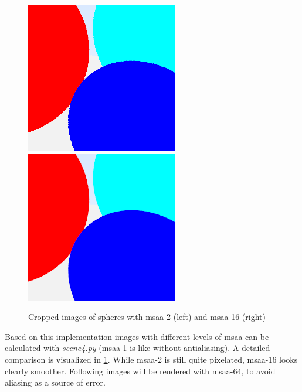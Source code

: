 \documentclass[]{article}
\begin{document}
	\begin{figure}[h]
		\centering
		\includegraphics[width=0.45\linewidth]{image4-2-zoom}
		\includegraphics[width=0.45\linewidth]{image4-5-zoom}
		\caption{Cropped images of spheres with \ac{msaa}-2 (left) and \ac{msaa}-16 (right)}
		\label{fig:image4}
	\end{figure}

	Based on this implementation images with different levels of \ac{msaa} can be calculated with \emph{scene4.py} (\ac{msaa}-1 is like without antialiasing). A detailed comparison is visualized in \cref{fig:image4}. While \ac{msaa}-2 is still quite pixelated, \ac{msaa}-16 looks clearly smoother. Following images will be rendered with \ac{msaa}-64, to avoid aliasing as a source of error.
	
	
	
\end{document}

